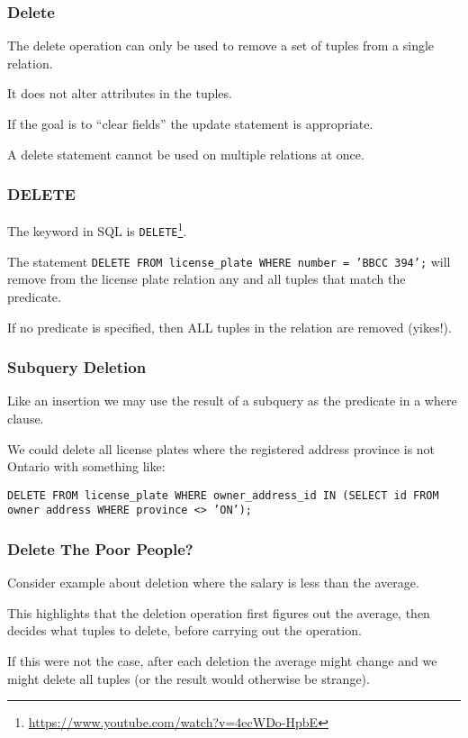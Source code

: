 \begin{frame}
\frametitle{Delete}

The delete operation can only be used to remove a set of tuples from a single relation.

It does not alter attributes in the tuples. 

If the goal is to ``clear fields'' the update statement is appropriate. 

A delete statement cannot be used on multiple relations at once.


\end{frame}



\begin{frame}
\frametitle{DELETE}

The keyword in SQL is \texttt{DELETE}\footnote{\url{https://www.youtube.com/watch?v=4ecWDo-HpbE}}. 

The statement \texttt{DELETE FROM license\_plate WHERE number = 'BBCC 394';} will remove from the license plate relation any and all tuples that match the predicate. 

If no predicate is specified, then ALL tuples in the relation are removed (yikes!).

\end{frame}



\begin{frame}
\frametitle{Subquery Deletion}


Like an insertion we may use the result of a subquery as the predicate in a where clause. 

We could delete all license plates where the registered address province is not Ontario with something like: 

\texttt{DELETE FROM license\_plate WHERE owner\_address\_id IN (SELECT id FROM owner address WHERE province <> 'ON');}

\end{frame}



\begin{frame}
\frametitle{Delete The Poor People?}

Consider example about deletion where the salary is less than the average. 

This highlights that the deletion operation first figures out the average, then decides what tuples to delete, before carrying out the operation. 

If this were not the case, after each deletion the average might change and we might delete all tuples (or the result would otherwise be strange). 


\end{frame}



